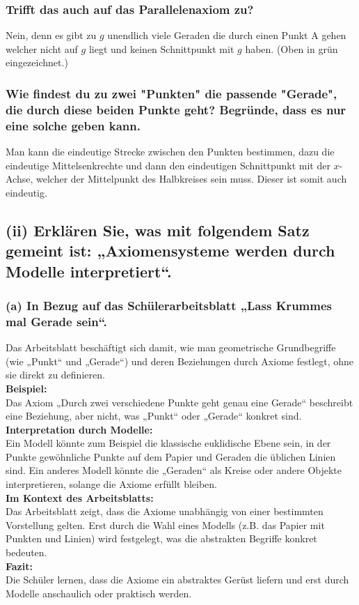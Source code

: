\documentclass[12pt,a4paper]{article}
\begin{document}
\subsubsection*{Trifft das auch auf das Parallelenaxiom zu?}
Nein, denn es gibt zu $g$ unendlich viele Geraden die durch einen Punkt A gehen welcher nicht auf $g$ liegt und keinen Schnittpunkt mit $g$ haben. (Oben in grün eingezeichnet.)
\subsubsection*{Wie findest du zu zwei "Punkten" die passende "Gerade", die durch diese beiden Punkte geht? Begründe, dass es nur eine solche geben kann.}
Man kann die eindeutige Strecke zwischen den Punkten bestimmen, dazu die eindeutige Mittelsenkrechte und dann den eindeutigen Schnittpunkt mit der $x$-Achse, welcher der Mittelpunkt des Halbkreises sein muss. Dieser ist somit auch eindeutig.\\

\subsection*{(ii) Erklären Sie, was mit folgendem Satz gemeint ist: „Axiomensysteme werden durch Modelle interpretiert“.}
\subsubsection*{(a) In Bezug auf das Schülerarbeitsblatt „Lass Krummes mal Gerade sein“.}
Das Arbeitsblatt beschäftigt sich damit, wie man geometrische Grundbegriffe (wie „Punkt“ und „Gerade“) und deren Beziehungen durch Axiome festlegt, ohne sie direkt zu definieren.\\ 
\textbf{Beispiel:}\\ 
Das Axiom „Durch zwei verschiedene Punkte geht genau eine Gerade“ beschreibt eine Beziehung, aber nicht, was „Punkt“ oder „Gerade“ konkret sind.\\ 
\textbf{Interpretation durch Modelle:}\\ 
Ein Modell könnte zum Beispiel die klassische euklidische Ebene sein, in der Punkte gewöhnliche Punkte auf dem Papier und Geraden die üblichen Linien sind. Ein anderes Modell könnte die „Geraden“ als Kreise oder andere Objekte interpretieren, solange die Axiome erfüllt bleiben.\\ 
\textbf{Im Kontext des Arbeitsblatts:}\\ 
Das Arbeitsblatt zeigt, dass die Axiome unabhängig von einer bestimmten Vorstellung gelten. Erst durch die Wahl eines Modells (z.B. das Papier mit Punkten und Linien) wird festgelegt, was die abstrakten Begriffe konkret bedeuten.\\ 
\textbf{Fazit:}\\ 
Die Schüler lernen, dass die Axiome ein abstraktes Gerüst liefern und erst durch Modelle anschaulich oder praktisch werden.
\end{document}
